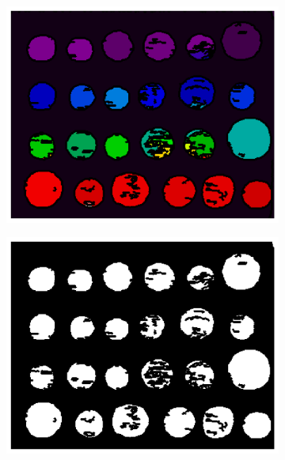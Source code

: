 \documentclass[11pt]{article}
\begin{document}
\begin{figure}[H]
    \begin{subfigure}{.33\textwidth}
        \centering
        \includegraphics[width=\linewidth]{figs/q1c_connected_components.png}
        \caption{}
    \end{subfigure}%
    \begin{subfigure}{.33\textwidth}
        \centering
        \includegraphics[width=\linewidth]{figs/q1c_mask_no_bg.png}
        \caption{}
    \end{subfigure}%
    \begin{subfigure}{.33\textwidth}
        \centering

\end{subfigure}
\end{figure}
\end{document}
